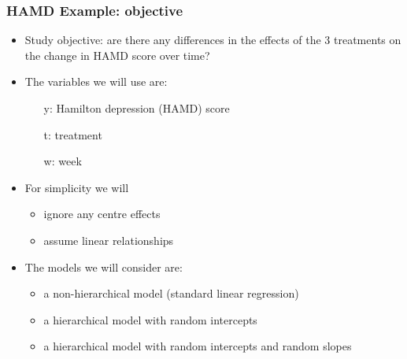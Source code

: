 \documentclass{beamer}
\begin{document}
\begin{frame}
    \frametitle{HAMD Example: objective}
    \begin{itemize}
        \item Study objective: are there any differences in the effects of the 3 treatments on the change in HAMD score over time?\vspace{2mm}
        \item The variables we will use are:\vspace{1mm}
        \begin{itemize}
            \item[y:] Hamilton depression (HAMD) score\vspace{1mm}
            \item[t:] treatment\vspace{1mm}
            \item[w:] week\vspace{2mm}
        \end{itemize}
        \item For simplicity we will\vspace{1mm}
        \begin{itemize}
            \item ignore any centre effects\vspace{1mm}
            \item assume linear relationships\vspace{2mm}
        \end{itemize}
        \item The models we will consider are:\vspace{1mm}
        \begin{itemize}
            \item a non-hierarchical model (standard linear regression)\vspace{1mm}
            \item a hierarchical model with random intercepts\vspace{1mm}
           \item a hierarchical model with random intercepts and random slopes\vspace{1mm}
        \end{itemize}
    \end{itemize}
\end{frame}
\end{document}
